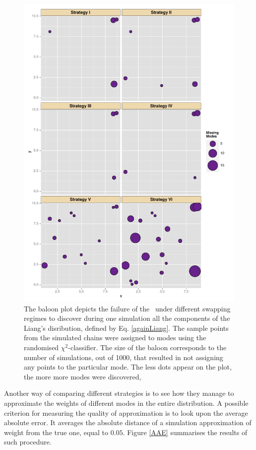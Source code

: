 \begin{figure}[ht]
	\centering \includegraphics[height=.7\textheight,keepaspectratio=TRUE]{./img/ggplotMissingModes.pdf}
	\caption[Undiscovered Modes by the \PT\,representented by a baloon-plot.]{
		The baloon plot depicts the failure of the \PT\, under different swapping regimes to discover during one simulation all the components of the Liang's disribution, defined by Eq. \ref{againLiang}. The sample points from the simulated chains were assigned to modes using the randomised $\chi^2$-classifier. The size of the baloon corresponds to the number of simulations, out of 1000, that resulted in not assigning any points to the particular mode. The less dots appear on the plot, the more more modes were discovered, 
	}\label{missingModes}
\end{figure}

Another way of comparing different strategies is to see how they manage to approximate the weights of different modes in the entire distribution. A possible criterion for measuring the quality of approximation is to look upon the average absolute error. It averages the absolute distance of a simulation approximation of weight from the true one, equal to $0.05$. Figure \ref{AAE} summarises the results of such procedure.

